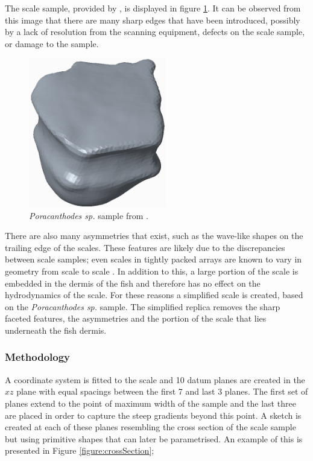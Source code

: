 \documentclass[12pt,oneside,a4paper]{article}
\begin{document}
The scale sample, provided by \cite{fletcher2014phd}, is displayed in figure \ref{figure:scaleSample}. It can be observed from this image that there are many sharp edges that have been introduced, possibly by a lack of resolution from the scanning equipment, defects on the scale sample, or damage to the sample.
\begin{figure}[!b]
\centering
\includegraphics[width=6cm]{images/Scale_Replication_1.PNG}\hfill
\caption{\textit{Poracanthodes sp.} sample from \cite{fletcher2014phd}.}
\label{figure:scaleSample}
\end{figure}
There are also many asymmetries that exist, such as the wave-like shapes on the trailing edge of the scales. These features are likely due to the discrepancies between scale samples; even scales in tightly packed arrays are known to vary in geometry from scale to scale \citep{fletcher2014phd}. In addition to this, a large portion of the scale is embedded in the dermis of the fish and therefore has no effect on the hydrodynamics of the scale. For these reasons a simplified scale is created, based on the \textit{Poracanthodes sp.} sample. The simplified replica removes the sharp faceted features, the asymmetries and the portion of the scale that lies underneath the fish dermis.

\subsubsection{Methodology}
A coordinate system is fitted to the scale and 10 datum planes are created in the $xz$ plane with equal spacings between the first 7 and last 3 planes. The first set of planes extend to the point of maximum width of the sample and the last three are placed in order to capture the steep gradients beyond this point. A sketch is created at each of these planes resembling the cross section of the scale sample but using primitive shapes that can later be parametrised. An example of this is presented in Figure \ref{figure:crossSection};
\end{document}
